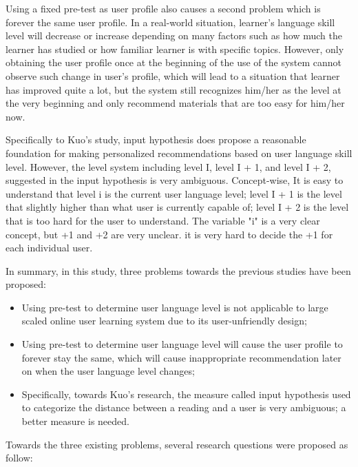 Using a fixed pre-test as user profile also causes a second problem which is forever the same user profile. In a real-world situation, learner's language skill level will decrease or increase depending on many factors such as how much the learner has studied or how familiar learner is with specific topics. However, only obtaining the user profile once at the beginning of the use of the system cannot observe such change in user's profile, which will lead to a situation that learner has improved quite a lot, but the system still recognizes him/her as the level at the very beginning and only recommend materials that are too easy for him/her now. 

Specifically to Kuo's study, input hypothesis \cite{Ostendorf2005} does propose a reasonable foundation for making personalized recommendations based on user language skill level. However, the level system including level I, level I + 1, and level I + 2, suggested in the input hypothesis is very ambiguous. Concept-wise, It is easy to understand that level i is the current user language level; level I + 1 is the level that slightly higher than what user is currently capable of; level I + 2 is the level that is too hard for the user to understand. The variable "i" is a very clear concept, but +1 and +2 are very unclear. it is very hard to decide the +1 for each individual user. 

In summary, in this study, three problems towards the previous studies have been proposed:

\begin{itemize}
  \item Using pre-test to determine user language level is not applicable to large scaled online user learning system due to its user-unfriendly design;
  \vspace{10pt}
  \item Using pre-test to determine user language level will cause the user profile to forever stay the same, which will cause inappropriate recommendation later on when the user language level changes;
  \vspace{10pt}
  \item Specifically, towards Kuo's research, the measure called input hypothesis used to categorize the distance between a reading and a user is very ambiguous; a better measure is needed.
\end{itemize}

Towards the three existing problems, several research questions were proposed as follow:

